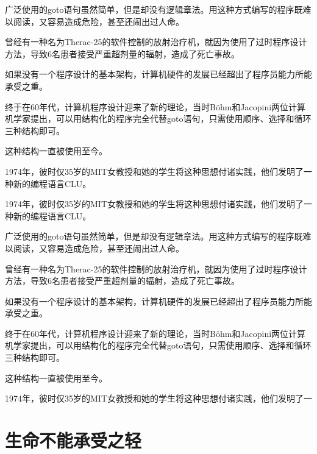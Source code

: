 \documentclass[custom]{linearbook}
\begin{document}
广泛使用的goto语句虽然简单，但是却没有逻辑章法。用这种方式编写的程序既难以阅读，又容易造成危险，甚至还闹出过人命。

曾经有一种名为Therac-25的软件控制的放射治疗机，就因为使用了过时程序设计方法，导致6名患者接受严重超剂量的辐射，造成了死亡事故。

如果没有一个程序设计的基本架构，计算机硬件的发展已经超出了程序员能力所能承受之重。

终于在60年代，计算机程序设计迎来了新的理论，当时Böhm和Jacopini两位计算机学家提出，可以用结构化的程序完全代替goto语句，只需使用顺序、选择和循环三种结构即可。

这种结构一直被使用至今。

1974年，彼时仅35岁的MIT女教授和她的学生将这种思想付诸实践，他们发明了一种新的编程语言CLU。

\begin{adjustwidth}{0em}{-4cm}

1974年，彼时仅35岁的MIT女教授和她的学生将这种思想付诸实践，他们发明了一种新的编程语言CLU。

广泛使用的goto语句虽然简单，但是却没有逻辑章法。用这种方式编写的程序既难以阅读，又容易造成危险，甚至还闹出过人命。

曾经有一种名为Therac-25的软件控制的放射治疗机，就因为使用了过时程序设计方法，导致6名患者接受严重超剂量的辐射，造成了死亡事故。

如果没有一个程序设计的基本架构，计算机硬件的发展已经超出了程序员能力所能承受之重。

终于在60年代，计算机程序设计迎来了新的理论，当时Böhm和Jacopini两位计算机学家提出，可以用结构化的程序完全代替goto语句，只需使用顺序、选择和循环三种结构即可。

这种结构一直被使用至今。

1974年，彼时仅35岁的MIT女教授和她的学生将这种思想付诸实践，他们发明了一
\end{adjustwidth}

\chapter{生命不能承受之轻}

\end{document}
